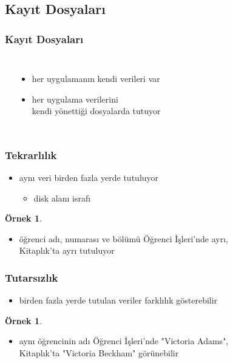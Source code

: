 \documentclass[dvipsnames]{beamer}
\theoremstyle{definition}
\theoremstyle{example}
\newtheorem{ornek}[theorem]{Örnek}
\theoremstyle{plain}
\begin{document}
\subsection{Kayıt Dosyaları}

\begin{frame}
  \frametitle{Kayıt Dosyaları}

  \begin{columns}[b]
    \begin{center}
    \end{center}

    \begin{itemize}
      \item her uygulamanın kendi verileri var
      \item her uygulama verilerini\\
	kendi yönettiği dosyalarda tutuyor
    \end{itemize}
  \end{columns}
\end{frame}

\begin{frame}
  \frametitle{Tekrarlılık}

  \begin{itemize}
    \item aynı veri birden fazla yerde tutuluyor
    \begin{itemize}
      \item disk alanı israfı
    \end{itemize}
  \end{itemize}

  \pause
  \begin{ornek}
    \begin{itemize}
      \item öğrenci adı, numarası ve bölümü Öğrenci İşleri'nde ayrı,\\
	Kitaplık'ta ayrı tutuluyor
    \end{itemize}
  \end{ornek}
\end{frame}

\begin{frame}
  \frametitle{Tutarsızlık}

  \begin{itemize}
    \item birden fazla yerde tutulan veriler farklılık gösterebilir
  \end{itemize}

  \pause
  \begin{ornek}
    \begin{itemize}
      \item aynı öğrencinin adı Öğrenci İşleri'nde "Victoria Adams",\\
	Kitaplık'ta "Victoria Beckham" görünebilir
    \end{itemize}
  \end{ornek}
\end{frame}
\end{document}
